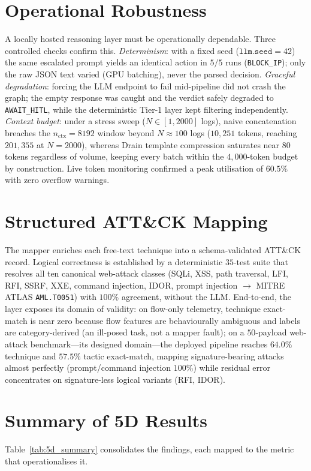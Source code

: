 \section{Operational Robustness}
A locally hosted reasoning layer must be operationally dependable. Three controlled checks confirm this. \emph{Determinism}: with a fixed seed ($\texttt{llm.seed}=42$) the same escalated prompt yields an identical action in $5/5$ runs (\texttt{BLOCK\_IP}); only the raw JSON text varied (GPU batching), never the parsed decision. \emph{Graceful degradation}: forcing the LLM endpoint to fail mid-pipeline did not crash the graph; the empty response was caught and the verdict safely degraded to \texttt{AWAIT\_HITL}, while the deterministic Tier-1 layer kept filtering independently. \emph{Context budget}: under a stress sweep ($N\in[1,2000]$ logs), naive concatenation breaches the $n_{\text{ctx}}=8192$ window beyond $N\approx100$ logs ($10{,}251$ tokens, reaching $201{,}355$ at $N=2000$), whereas Drain template compression saturates near $80$ tokens regardless of volume, keeping every batch within the $4{,}000$-token budget by construction. Live token monitoring confirmed a peak utilisation of $60.5\%$ with zero overflow warnings.

\section{Structured ATT\&CK Mapping}
The mapper enriches each free-text technique into a schema-validated ATT\&CK record. Logical correctness is established by a deterministic $35$-test suite that resolves all ten canonical web-attack classes (SQLi, XSS, path traversal, LFI, RFI, SSRF, XXE, command injection, IDOR, prompt injection $\rightarrow$ MITRE ATLAS \texttt{AML.T0051}) with $100\%$ agreement, without the LLM. End-to-end, the layer exposes its domain of validity: on flow-only telemetry, technique exact-match is near zero because flow features are behaviourally ambiguous and labels are category-derived (an ill-posed task, not a mapper fault); on a $50$-payload web-attack benchmark---its designed domain---the deployed pipeline reaches $64.0\%$ technique and $57.5\%$ tactic exact-match, mapping signature-bearing attacks almost perfectly (prompt/command injection $100\%$) while residual error concentrates on signature-less logical variants (RFI, IDOR).

\section{Summary of 5D Results}
Table~\ref{tab:5d_summary} consolidates the findings, each mapped to the metric that operationalises it.

